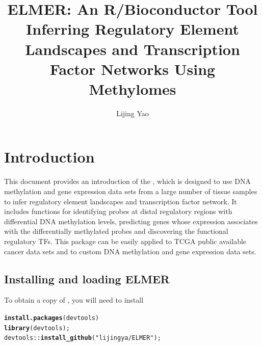 \documentclass{article}\usepackage[]{graphicx}\usepackage[usenames,dvipsnames]{color}
\title{ELMER: An R/Bioconductor Tool \\
Inferring Regulatory Element Landscapes and Transcription Factor Networks Using Methylomes}
\author {Lijing Yao}
\makeatletter
\newcommand{\hlstr}[1]{\textcolor[rgb]{0.192,0.494,0.8}{#1}}%
\newcommand{\hlopt}[1]{\textcolor[rgb]{0,0,0}{#1}}%
\newcommand{\hlstd}[1]{\textcolor[rgb]{0.345,0.345,0.345}{#1}}%
\newcommand{\hlkwd}[1]{\textcolor[rgb]{0.737,0.353,0.396}{\textbf{#1}}}%
\newenvironment{kframe}{%
 \def\at@end@of@kframe{}%
 \ifinner\ifhmode%
  \def\at@end@of@kframe{\end{minipage}}%
  \begin{minipage}{\columnwidth}%
 \fi\fi%
 \def\FrameCommand##1{\hskip\@totalleftmargin \hskip-\fboxsep
 \colorbox{shadecolor}{##1}\hskip-\fboxsep
     \hskip-\linewidth \hskip-\@totalleftmargin \hskip\columnwidth}%
 \MakeFramed {\advance\hsize-\width
   \@totalleftmargin\z@ \linewidth\hsize
   \@setminipage}}%
 {\par\unskip\endMakeFramed%
 \at@end@of@kframe}
\newenvironment{knitrout}{}{} %
\makeatother
\begin{document}
\maketitle

\tableofcontents
\section{Introduction}
This document provides an introduction of the , which is designed 
to use DNA methylation and gene expression data sets from a large number
of tissue samples to infer regulatory element landscapes and transcription factor network.
It includes functions for identifying probes at distal regulatory regions with differential 
DNA methylation levels, predicting genes whose expression associates with the differentially
methylated probes and discovering the functional regulatory TFs. This package can be easily
applied to TCGA public available cancer data sets and to custom DNA methylation 
and gene expression data sets. 

\subsection{Installing and loading ELMER}
To obtain a copy of , you will need to install 
\begin{knitrout}
\color{fgcolor}\begin{kframe}
\begin{alltt}
\hlkwd{install.packages}\hlstd{(devtools)}
\hlkwd{library}\hlstd{(devtools);}
\hlstd{devtools}\hlopt{::}\hlkwd{install_github}\hlstd{(}\hlstr{"lijingya/ELMER"}\hlstd{);}
\end{alltt}
\end{kframe}
\end{knitrout}
\end{document}
